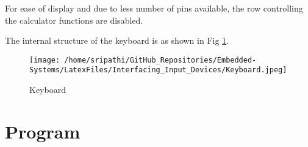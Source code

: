 \documentclass[12pt, letterpaper]{article}
\begin{document}
For ease of display and due to less number of pins available, the row controlling the calculator functions are disabled. 

The internal structure of the keyboard is as shown in Fig \ref{fig:keyboard}.

\begin{figure}[!h]
	\centering
	\texttt{[image: /home/sripathi/GitHub\_Repositories/Embedded-Systems/LatexFiles/Interfacing\_Input\_Devices/Keyboard.jpeg]}
	\caption{Keyboard}
	\label{fig:keyboard}
\end{figure}

\section{Program}


\end{document}
